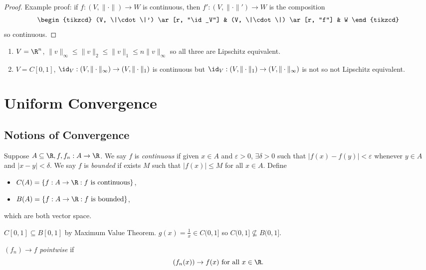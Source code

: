 \documentclass[a4paper]{article}
\theoremstyle{definition}
\begin{document}
\begin{proof}
  Example proof: if \(f:(V, \|\cdot\|)\to W\) is continuous, then \(f':(V,\|\cdot\|') \to W\) is the composition
  \[
    \begin{tikzcd}
      (V, \|\cdot\|') \ar[r, "\id_V"] & (V, \|\cdot\|) \ar[r, "f"] & W
    \end{tikzcd}
  \]
  so continuous.
\end{proof}

\begin{eg}\leavevmode
  \begin{enumerate}
  \item \(V=\R^n\), \(\|v\|_\infty \leq \|v\|_2 \leq \|v\|_1 \leq n \|v\|_\infty\) so all three are Lipschitz equivalent.
  \item \(V=C[0,1]\), \(\id_V:(V, \|\cdot\|_\infty)\to (V,\|\cdot\|_1)\) is continuous but \(\id_V:(V, \|\cdot\|_1)\to (V,\|\cdot\|_\infty)\) is not so not Lipschitz equivalent.
  \end{enumerate}
\end{eg}

\section{Uniform Convergence}

\subsection{Notions of Convergence}

Suppose \(A\subseteq \R, f, f_n: A\to \R\). We say \(f\) is \emph{continuous} if given \(x\in A\) and \(\varepsilon>0\), \(\exists \delta>0\) such that \(|f(x)-f(y)| < \varepsilon\) whenever \(y\in A\) and \(|x-y| < \delta\). We say \(f\) is \emph{bounded} if exists \(M\) such that \(|f(x)| \leq M\) for all \(x\in A\). Define
\begin{itemize}
\item \(C(A) = \{f: A\to \R: f \text{ is continuous}\}\),
\item \(B(A) = \{f:A\to \R: f \text{ is bounded}\}\),
\end{itemize}
which are both vector space.

\begin{eg}
  \(C[0,1] \subseteq B[0,1]\) by Maximum Value Theorem. \(g(x) = \frac{1}{x} \in C(0,1]\) so \(C(0,1] \nsubseteq B(0,1]\).
\end{eg}

\begin{definition}
  \((f_n) \to f\) \emph{pointwise} if
  \[
    (f_n(x)) \to f(x) \text{ for all } x\in \R.
    \]
\end{definition}
\end{document}
